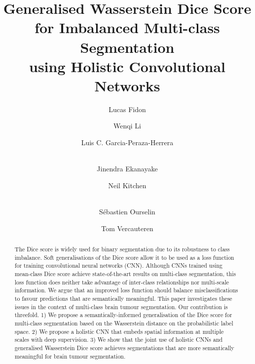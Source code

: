 \documentclass[runningheads,orivec,a4paper]{llncs}
\begin{document}
\mainmatter  %

\title{Generalised Wasserstein Dice Score for Imbalanced Multi-class Segmentation\\
      using Holistic Convolutional Networks}


\author{Lucas Fidon%
	\and Wenqi Li\and Luis C. Garcia-Peraza-Herrera\and\\ 
	Jinendra Ekanayake\and Neil
        Kitchen\and\\S\'ebastien Ourselin \and Tom Vercauteren}




\maketitle


\begin{abstract}
The Dice score is widely used for binary segmentation due to its robustness to class imbalance.
Soft generalisations of the Dice score allow it to be used as a loss function for training convolutional neural networks (CNN).
Although CNNs trained using mean-class Dice score achieve state-of-the-art
results on multi-class segmentation, this loss function
does neither take advantage of inter-class relationships nor
multi-scale information.
We argue that an improved loss function should balance
misclassifications to favour predictions that are
semantically meaningful.  
This paper investigates these issues in the context of multi-class brain tumour segmentation.
Our contribution is threefold. 1) We propose a semantically-informed
generalisation of the 
Dice score for multi-class segmentation based on the Wasserstein
distance on the probabilistic label space.
2) We propose a holistic CNN that embeds spatial information at multiple scales with deep supervision.
3) We show that the joint use of holistic CNNs and generalised
Wasserstein Dice score achieves segmentations that are more semantically meaningful for brain tumour segmentation. 
\end{abstract}
\end{document}
